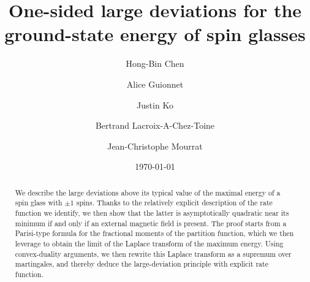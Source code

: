 \documentclass[11pt]{amsart}
\theoremstyle{remark}
\theoremstyle{definition}
\numberwithin{equation}{section}
\numberwithin{proposition}{section}
\numberwithin{figure}{section}
\numberwithin{table}{section}
\newcommand{\1}{\mathbf{1}}
\begin{document}
\author[H.-B. Chen]{Hong-Bin Chen}
\address[Hong-Bin Chen]{NYU-ECNU Institute of Mathematical Sciences, NYU Shanghai, Shanghai, China}

\author[A. Guionnet]{Alice Guionnet}
\address[Alice Guionnet]{Department of Mathematics, ENS Lyon and CNRS, Lyon, France}

\author[J. Ko]{Justin Ko}
\address[Justin Ko]{Department of Mathematics, Syracuse University, New York, United States}

\author[B. Lacroix-A-Chez-Toine]{Bertrand Lacroix-A-Chez-Toine}
\address[Bertrand Lacroix-A-Chez-Toine]{Department of Mathematics, King's College, London, United Kingdom}

\author[J.-C. Mourrat]{Jean-Christophe Mourrat}
\address[Jean-Christophe Mourrat]{Department of Mathematics, ENS Lyon and CNRS, Lyon, France}




\keywords{}
\subjclass[2010]{}
\date{\today}



\title[Large deviations for the ground-state energy]{One-sided large deviations for the ground-state energy of spin glasses}



\begin{abstract}
We describe the large deviations above its typical value of the maximal energy of a spin glass with $\pm 1$ spins. Thanks to the relatively explicit description of the rate function we identify, we then show that the latter is asymptotically quadratic near its minimum if and only if an external magnetic field is present. The proof starts from a Parisi-type formula for the fractional moments of the partition function, which we then leverage to obtain the limit of the Laplace transform of the maximum energy. Using convex-duality arguments, we then rewrite this Laplace transform as a supremum over martingales, and thereby deduce the large-deviation principle with explicit rate function. 
\end{abstract}


\maketitle



%
%
%
%
%
%



\tableofcontents
\end{document}
